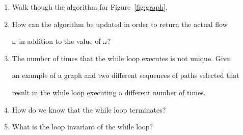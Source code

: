 \documentclass{article}
\begin{document}
\newpage

\begin{enumerate}

    \item Walk though the algorithm for Figure~\ref{fig:graph}.

    \item How can the algorithm be updated in order to return the actual flow

        $\omega$ in addition to the value of $\omega$?

    \item The number of times that the while loop executes is not unique.  Give

        an example of a graph and two different sequences of paths selected that

        result in the while loop executing a different number of times.

    \item How do we know that the while loop terminates?

    \item What is the loop invariant of the while loop?

\end{enumerate}
\end{document}
